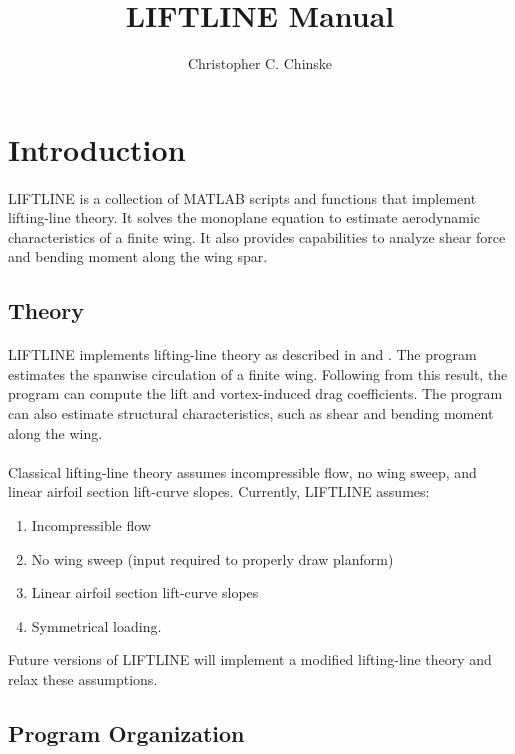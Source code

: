 \documentclass{article}
\title{LIFTLINE Manual}
\author{Christopher C. Chinske}
\begin{document}
\maketitle
\newpage
\tableofcontents
\newpage
\section{Introduction}
\paragraph{}
LIFTLINE is a collection of MATLAB scripts and functions that
implement lifting-line theory.  It solves the monoplane equation to
estimate aerodynamic characteristics of a finite wing.  It also
provides capabilities to analyze shear force and bending moment along
the wing spar.
\subsection{Theory}
\paragraph{}
LIFTLINE implements lifting-line theory as described in \cite{bertin}
and \cite{anderson}.  The program estimates the spanwise circulation
of a finite wing.  Following from this result, the program can compute
the lift and vortex-induced drag coefficients.  The program can also
estimate structural characteristics, such as shear and bending moment
along the wing.
\paragraph{}
Classical lifting-line theory assumes incompressible flow, no wing
sweep, and linear airfoil section lift-curve slopes.  Currently,
LIFTLINE assumes:
\begin{enumerate}
\item Incompressible flow
\item No wing sweep (input required to properly draw planform)
\item Linear airfoil section lift-curve slopes
\item Symmetrical loading.
\end{enumerate}
Future versions of LIFTLINE will implement a modified lifting-line
theory and relax these assumptions.
\subsection{Program Organization}
\end{document}
